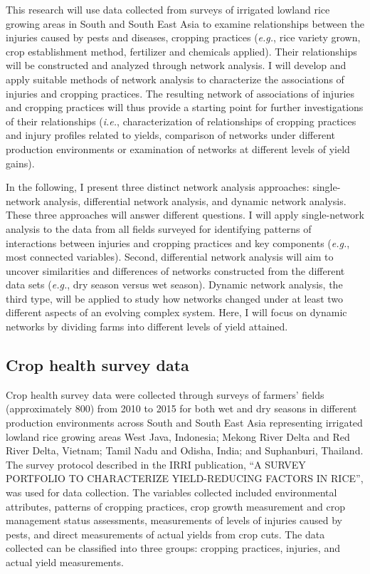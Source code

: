 
This research will use data collected from surveys of irrigated lowland rice growing areas in South and South East Asia to examine relationships between the injuries caused by pests and diseases, cropping practices (\textit{e.g.}, rice variety grown, crop establishment method, fertilizer and chemicals applied). Their relationships will be constructed and analyzed through network analysis. I will develop and apply suitable methods of network analysis to characterize the associations of injuries and cropping practices. The resulting network of associations of injuries and cropping practices will thus provide a starting point for further investigations of their relationships (\textit{i.e.}, characterization of relationships of cropping practices and injury profiles related to yields, comparison of networks under different production environments or examination of networks at different levels of yield gains). 

In the following, I present three distinct network analysis approaches: single-network analysis, differential network analysis, and dynamic network analysis. These three approaches will answer different questions. I will apply single-network analysis to the data from all fields surveyed for identifying patterns of interactions between injuries and cropping practices and key components (\textit{e.g.}, most connected variables). Second, differential network analysis will aim to uncover similarities and differences of networks constructed from the different data sets (\textit{e.g.}, dry season versus wet season). Dynamic network analysis, the third type, will be applied to study how networks changed under at least two different aspects of an evolving complex system. Here, I will focus on dynamic networks by dividing farms into different levels of yield attained. 

\subsection*{Crop health survey data}

Crop health survey data were collected through surveys of farmers' fields (approximately 800) from 2010 to 2015 for both wet and dry seasons in different production environments across South and South East Asia representing irrigated lowland rice growing areas West Java, Indonesia; Mekong River Delta and Red River Delta, Vietnam; Tamil Nadu and Odisha, India; and Suphanburi, Thailand. The survey protocol described in the IRRI publication, ``A SURVEY PORTFOLIO TO CHARACTERIZE YIELD-REDUCING FACTORS IN RICE'', \citep{Savarysurvey2009} was used for data collection. The variables collected included environmental attributes, patterns of cropping practices, crop growth measurement and crop management status assessments, measurements of levels of injuries caused by pests, and direct measurements of actual yields from crop cuts. The data collected can be classified into three groups: cropping practices, injuries, and actual yield measurements.

